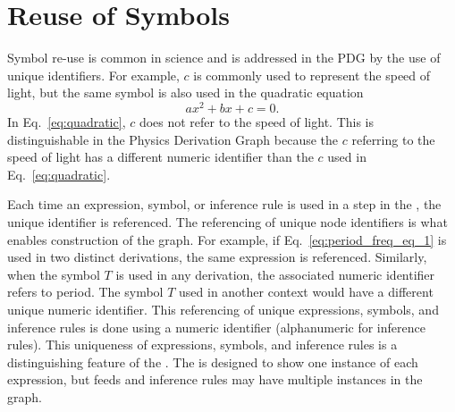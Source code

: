 \section{Reuse of Symbols\label{sec:symbol_reuse}}

 Symbol re-use is common in science and is addressed in the PDG by the use
  of unique identifiers.
  For example, \(c\) is commonly used to represent the speed of light, but
  the same symbol is also used in the quadratic equation
\begin{equation}
a x^2+b x+c =0.
\label{eq:quadratic}
\end{equation}
In Eq.~\ref{eq:quadratic}, \(c\) does not refer to the speed of light.
This is distinguishable in the Physics Derivation Graph because the \(c\)
  referring to the speed of light has a different numeric identifier than
  the \(c\) used in Eq.~\ref{eq:quadratic}.


Each time an expression, symbol, or inference rule is used in a step in the
  \pdg{}, the unique identifier is referenced.
  The referencing of unique node identifiers is what enables construction of
  the graph.
  For example, if Eq.~\ref{eq:period_freq_eq_1} is used in two distinct
  derivations, the same expression is referenced.
  Similarly, when the symbol \(T\) is used in any derivation, the associated
  numeric identifier refers to period.
  The symbol \(T\) used in another context would have a different unique
  numeric identifier.
This referencing of unique expressions, symbols, and inference rules is
done using a numeric identifier (alphanumeric for inference rules).
This uniqueness of expressions, symbols, and inference rules is a distinguishing feature of the \pdg{}.
The \pdg{} is designed to show one instance of each
expression, but feeds and inference rules may have multiple instances in the graph.